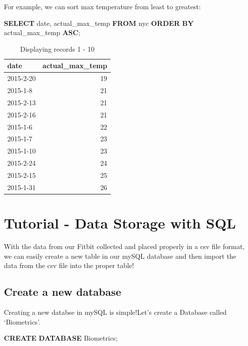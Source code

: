 \documentclass[]{book}
\newenvironment{Shaded}{\begin{snugshade}}{\end{snugshade}}
\newcommand{\KeywordTok}[1]{\textcolor[rgb]{0.13,0.29,0.53}{\textbf{#1}}}
\newcommand{\DataTypeTok}[1]{\textcolor[rgb]{0.13,0.29,0.53}{#1}}
\newcommand{\NormalTok}[1]{#1}
\begin{document}
For example, we can sort max temperature from least to greatest:

\begin{Shaded}
\begin{Highlighting}[]
\KeywordTok{SELECT} \DataTypeTok{date}\NormalTok{, actual_max_temp }\KeywordTok{FROM}\NormalTok{ nyc }\KeywordTok{ORDER} \KeywordTok{BY}\NormalTok{ actual_max_temp }\KeywordTok{ASC}\NormalTok{;}
\end{Highlighting}
\end{Shaded}

\begin{table}

\caption{\label{tab:unnamed-chunk-71}Displaying records 1 - 10}
\centering
\begin{tabular}[t]{l|r}
\hline
date & actual\_max\_temp\\
\hline
2015-2-20 & 19\\
\hline
2015-1-8 & 21\\
\hline
2015-2-13 & 21\\
\hline
2015-2-16 & 21\\
\hline
2015-1-6 & 22\\
\hline
2015-1-7 & 23\\
\hline
2015-1-10 & 23\\
\hline
2015-2-24 & 24\\
\hline
2015-2-15 & 25\\
\hline
2015-1-31 & 26\\
\hline
\end{tabular}
\end{table}

\chapter{Tutorial - Data Storage with
SQL}\label{tutorial---data-storage-with-sql}

With the data from our Fitbit collected and placed properly in a csv
file format, we can easily create a new table in our mySQL database and
then import the data from the csv file into the proper table!

\section{Create a new database}\label{create-a-new-database}

Creating a new databse in mySQL is simple!Let's create a Database called
`Biometrics'.

\begin{Shaded}
\begin{Highlighting}[]
\KeywordTok{CREATE} \KeywordTok{DATABASE}\NormalTok{ Biometrics;}
\end{Highlighting}
\end{Shaded}
\end{document}
